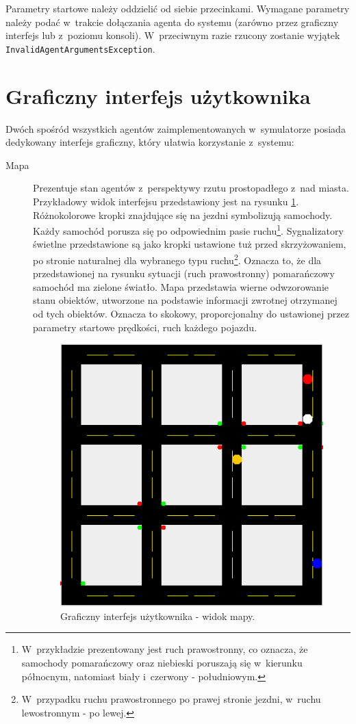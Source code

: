 \documentclass[a4paper,11pt]{article}
\begin{document}
Parametry startowe należy oddzielić od siebie przecinkami. Wymagane parametry należy podać w~trakcie dołączania agenta do systemu (zarówno przez graficzny interfejs lub z~poziomu konsoli). W~przeciwnym razie rzucony zostanie wyjątek \verb+InvalidAgentArgumentsException+.

\section{Graficzny interfejs użytkownika}

Dwóch spośród wszystkich agentów zaimplementowanych w~symulatorze posiada dedykowany interfejs graficzny, który ułatwia korzystanie z~systemu:

\begin{description}
    \item[Mapa] Prezentuje stan agentów z~perspektywy rzutu prostopadłego z~nad miasta. Przykładowy widok interfejsu przedstawiony jest na rysunku \ref{img:map}. Różnokolorowe kropki znajdujące się na jezdni symbolizują samochody. Każdy samochód porusza się po odpowiednim pasie ruchu\footnote{W~przykładzie prezentowany jest ruch prawostronny, co oznacza, że samochody pomarańczowy oraz niebieski poruszają się w~kierunku północnym, natomiast biały i~czerwony - południowym.}. Sygnalizatory świetlne przedstawione są jako kropki ustawione tuż przed skrzyżowaniem, po stronie naturalnej dla wybranego typu ruchu\footnote{W~przypadku ruchu prawostronnego po prawej stronie jezdni, w~ruchu lewostronnym - po lewej.}. Oznacza to, że dla przedstawionej na rysunku sytuacji (ruch prawostronny) pomarańczowy samochód ma zielone światło. Mapa przedstawia wierne odwzorowanie stanu obiektów, utworzone na podstawie informacji zwrotnej otrzymanej od tych obiektów. Oznacza to skokowy, proporcjonalny do ustawionej przez parametry startowe prędkości, ruch każdego pojazdu.
\begin{figure}[ht!]
    \centering
    \includegraphics[width=.95\textwidth]{gui_map.png}
    \caption{Graficzny interfejs użytkownika - widok mapy.}
    \label{img:map}
\end{figure}


\end{description}
\end{document}
